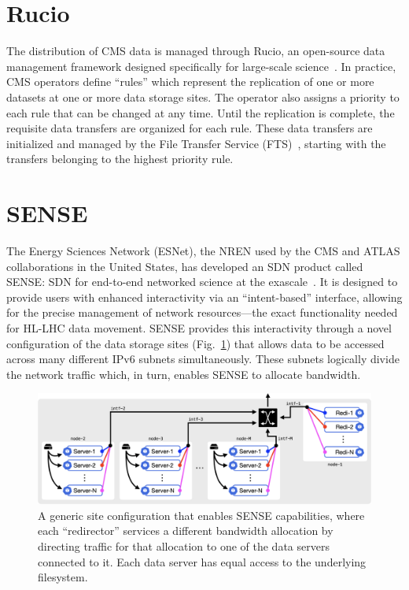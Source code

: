 \section{Rucio}
The distribution of CMS data is managed through Rucio, an open-source data management framework designed specifically for large-scale science~\cite{Rucio2019}. 
In practice, CMS operators define ``rules'' which represent the replication of one or more datasets at one or more data storage sites. 
The operator also assigns a priority to each rule that can be changed at any time. 
Until the replication is complete, the requisite data transfers are organized for each rule. 
These data transfers are initialized and managed by the File Transfer Service (FTS)~\cite{FTS3}, starting with the transfers belonging to the highest priority rule. 

\section{SENSE}
The Energy Sciences Network (ESNet), the NREN used by the CMS and ATLAS collaborations in the United States, has developed an SDN product called SENSE: SDN for end-to-end networked science at the exascale~\cite{SENSE}. 
It is designed to provide users with enhanced interactivity via an ``intent-based'' interface, allowing for the precise management of network resources---the exact functionality needed for HL-LHC data movement. 
SENSE provides this interactivity through a novel configuration of the data storage sites (Fig.~\ref{fig:sense_site}) that allows data to be accessed across many different IPv6 subnets simultaneously. 
These subnets logically divide the network traffic which, in turn, enables SENSE to allocate bandwidth. 

\begin{figure}[htb]
    \centering
    \includegraphics[width=.9\textwidth]{fig/cyber/rucio-sense_site.png}
    \caption[Rucio-SENSE site configuration]{
        A generic site configuration that enables SENSE capabilities, where each ``redirector'' services a different bandwidth allocation by directing traffic for that allocation to one of the data servers connected to it. 
        Each data server has equal access to the underlying filesystem.
    }
    \label{fig:sense_site}
\end{figure}

